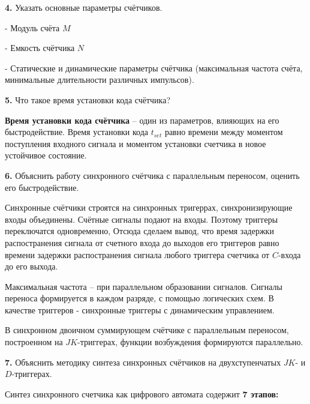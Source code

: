 \noindent\textbf{4.} Указать основные параметры счётчиков.\newline

\noindent- Модуль счёта $M$

\noindent- Емкость счётчика $N$

\noindent- Статические и динамические параметры счётчика (максимальная частота счёта, минимальные длительности различных импульсов).\newline

\noindent\textbf{5.} Что такое время установки кода счётчика?\newline

\noindent \textbf{Время установки кода счётчика} – один из параметров, влияющих на его быстродействие. Время установки кода $t_{set}$ равно времени между моментом поступления входного сигнала и моментом установки счетчика в новое устойчивое состояние.
\newline

\noindent\textbf{6.} Объяснить работу синхронного счётчика с параллельным переносом, оценить его быстродействие.\newline

\noindent Синхронные счётчики строятся на синхронных тригеррах, синхронизирующие входы объединены. Счётные сигналы подают на входы. Поэтому триггеры переключатся одновременно, Отсюда сделаем вывод, что время задержки распостранения сигнала от счетного входа до выходов его триггеров равно времени задержки распостранения сигнала любого триггера счетчика от $C$-входа до его выхода.\newline

\noindent Максимальная частота -- при параллельном образовании сигналов. Сигналы переноса формируется в каждом разряде, с помощью логических схем. В качестве триггеров - синхронные триггеры с динамическим управлением.\newline

\noindent В синхронном двоичном суммирующем счётчике с параллельным переносом, построенном на $JK$-триггерах, функции возбуждения формируются параллельно.\newline

\noindent\textbf{7. } Объяснить методику синтеза синхронных счётчиков на двухступенчатых $JK$- и $D$-триггерах.\newline

\noindent Синтез синхронного счетчика как цифрового автомата содержит \textbf{7 этапов:} \newline

